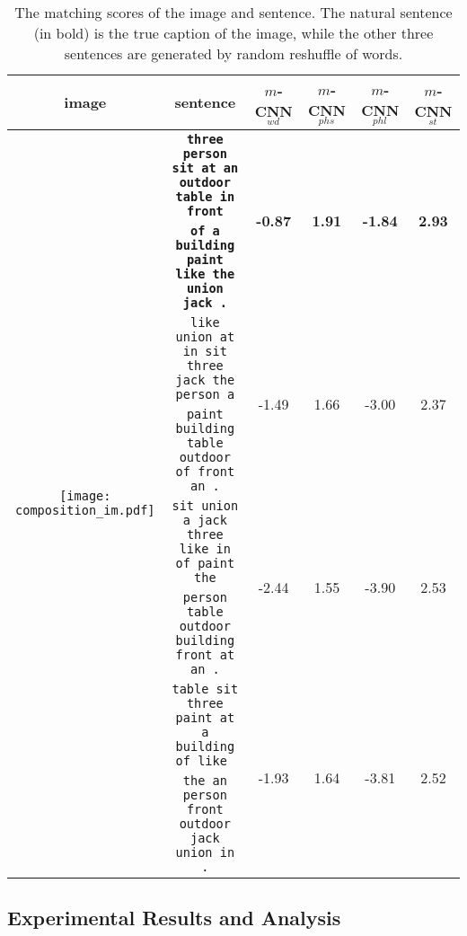 \documentclass[10pt,twocolumn,letterpaper]{article}
\begin{document}
\begin{table*} \scriptsize
\begin{center}

    \renewcommand{\multirowsetup}{\centering}
    \begin{tabular}{c|c|cccc}
    \hline

     image   &sentence & {$m$-CNN$_{wd}$} & {$m$-CNN$_{phs}$} & {$m$-CNN$_{phl}$} & {$m$-CNN$_{st}$}\\
        \hline
        \hline
  \multirow{8}{*}{\texttt{[image: composition\_im.pdf]}} &\texttt{\textbf{three person sit at an outdoor table in front}} & \multirow{2}{*}{\textbf{-0.87}} & \multirow{2}{*}{\textbf{1.91}} & \multirow{2}{*}{\textbf{-1.84}} & \multirow{2}{*}{\textbf{2.93}}  \\
  &\texttt{\textbf{of a building paint like the union jack .}} & & & &  \\
  \cline{2-6}
  &\texttt{like union at in sit three jack the person a}&\multirow{2}{*}{-1.49} & \multirow{2}{*}{1.66} & \multirow{2}{*}{-3.00} & \multirow{2}{*}{2.37}  \\
  &\texttt{paint building table outdoor of front an .} & & & &  \\
  \cline{2-6}
  &\texttt{sit union a jack three like in of paint the}&\multirow{2}{*}{-2.44} & \multirow{2}{*}{1.55} & \multirow{2}{*}{-3.90} & \multirow{2}{*}{2.53}  \\
  &\texttt{person table outdoor building front at an .} & & & &  \\
 \cline{2-6}
&\texttt{table sit three paint at a building of like }&\multirow{2}{*}{-1.93} & \multirow{2}{*}{1.64} & \multirow{2}{*}{-3.81} & \multirow{2}{*}{2.52} \\
  &\texttt{the an person front outdoor jack union in .} & & & &  \\
  \hline
  \hline

    \end{tabular}


\end{center}
\caption{The matching scores of the image and sentence. The natural sentence (in bold) is the true caption of the image, while the other three sentences are generated by random reshuffle of words.}
\label{table:composition}
\vspace{-10pt}
\end{table*}


\subsection{Experimental Results and Analysis}
\end{document}
